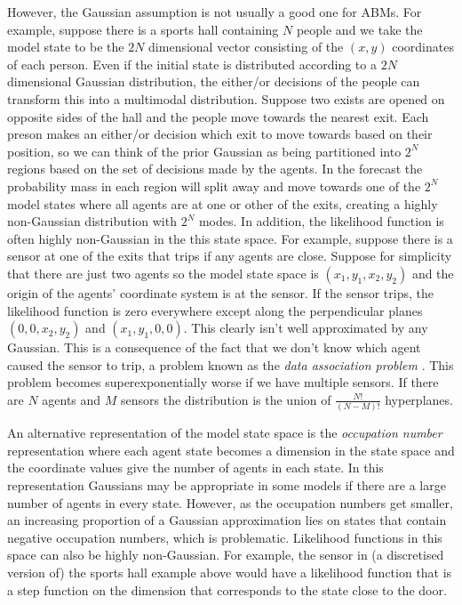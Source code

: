 \documentclass{article}
\begin{document}
However, the Gaussian assumption is not usually a good one for ABMs. For example, suppose there is a sports hall containing $N$ people and we take the model state to be the $2N$ dimensional vector consisting of the $(x,y)$ coordinates of each person. Even if the initial state is distributed according to a $2N$ dimensional Gaussian distribution, the either/or decisions of the people can transform this into a multimodal distribution. Suppose two exists are opened on opposite sides of the hall and the people move towards the nearest exit. Each preson makes an either/or decision which exit to move towards based on their position, so we can think of the prior Gaussian as being partitioned into $2^N$ regions based on the set of decisions made by the agents. In the forecast the probability mass in each region will split away and move towards one of the $2^N$ model states where all agents are at one or other of the exits, creating a highly non-Gaussian distribution with $2^N$ modes. In addition, the likelihood function is often highly non-Gaussian in the this state space. For example, suppose there is a sensor at one of the exits that trips if any agents are close. Suppose for simplicity that there are just two agents so the model state space is $(x_1,y_1,x_2,y_2)$ and the origin of the agents' coordinate system is at the sensor. If the sensor trips, the likelihood function is zero everywhere except along the perpendicular planes $(0,0,x_2,y_2)$ and $(x_1,y_1,0,0)$. This clearly isn't well approximated by any Gaussian. This is a consequence of the fact that we don't know which agent caused the sensor to trip, a problem known as the \textit{data association problem} \citep{lueck_who_2019}. This problem becomes superexponentially worse if we have multiple sensors. If there are $N$ agents and $M$ sensors the distribution is the union of $\frac{N!}{(N-M)!}$ hyperplanes.

An alternative representation of the model state space is the \textit{occupation number} representation where each agent state becomes a dimension in the state space and the coordinate values give the number of agents in each state. In this representation Gaussians may be appropriate in some models if there are a large number of agents in every state. However, as the occupation numbers get smaller, an increasing proportion of a Gaussian approximation lies on states that contain negative occupation numbers, which is problematic. Likelihood functions in this space can also be highly non-Gaussian. For example, the sensor in (a discretised version of) the sports hall example above would have a likelihood function that is a step function on the dimension that corresponds to the state close to the door.
\end{document}
